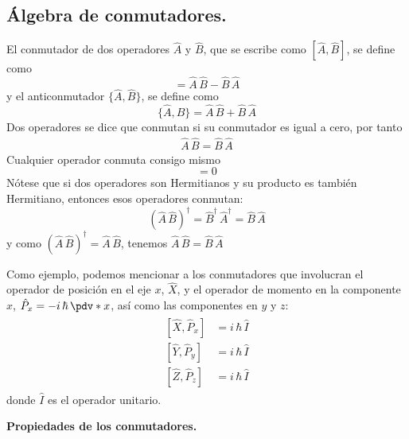 \subsection{Álgebra de conmutadores.}
El conmutador de dos operadores $\hat{A}$  y $\hat{B}$, que se escribe como $[\hat{A}, \hat{B}]$, se define como
\begin{equation}
[\hat{A}, \hat{B}] = \hat{A} \, \hat{B} - \hat{B} \, \hat{A}
\label{eq:ecuacion_02_79}
\end{equation}
y el anticonmutador $\{ \hat{A}, \hat{B} \}$, se define como
\begin{equation}
\{ \hat{A}, \hat{B} \} = \hat{A} \, \hat{B} + \hat{B} \, \hat{A}
\label{eq:ecuacion_02_80}
\end{equation}
Dos operadores se dice que conmutan si su conmutador es igual a cero, por tanto
\begin{align*}
\hat{A} \, \hat{B} = \hat{B} \, \hat{A}
\end{align*}
Cualquier operador conmuta consigo mismo
\begin{equation}
[\hat{A}, \hat{A}] = 0
\label{eq:ecuacion_02_81}
\end{equation}
Nótese que si dos operadores son Hermitianos y su producto es también Hermitiano, entonces esos operadores conmutan:
\begin{equation}
(\hat{A} \, \hat{B})^{\dagger} = \hat{B}^{\dagger} \, \hat{A}^{\dagger} = \hat{B} \, \hat{A}
\label{eq:ecuacion_02_82}
\end{equation}
y como $(\hat{A} \, \hat{B})^{\dagger} = \hat{A} \, \hat{B}$, tenemos $\hat{A} \, \hat{B} = \hat{B} \, \hat{A}$
\par
Como ejemplo, podemos mencionar a los conmutadores que involucran el operador de posición en el eje $x$, $\hat{X}$, y el operador de momento en la componente $x$, $\hat{P}_{x} = - i \, \hbar \, \pdv*{x}$, así como las componentes en $y$ y $z$:
\begin{align}
\begin{aligned}
[\hat{X}, \hat{P}_{x}] &= i \, \hbar \, \hat{I} \\
[\hat{Y}, \hat{P}_{y}] &= i \, \hbar \, \hat{I} \\
[\hat{Z}, \hat{P}_{z}] &= i \, \hbar \, \hat{I}
\end{aligned}
\label{eq:ecuacion_02_83}
\end{align}
donde $\hat{I}$ es el operador unitario.

\textbf{Propiedades de los conmutadores.}

